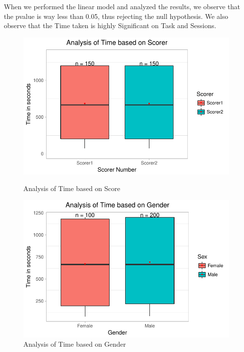 \documentclass[12pt,epsf]{report}
\begin{document}
{When we performed the linear model and analyzed the results, we observe that the pvalue is way less than 0.05, thus rejecting the null hypothesis. We also observe that the Time taken is highly Significant on Task and Sessions. \\
\begin{figure}[!htb]
	\begin{minipage}[c]{0.5\linewidth}
	\includegraphics[width=\linewidth]{ScorerVsTime.pdf}
	\caption{Analysis of Time based on Score }
	\end{minipage}
	\hfill
	\begin{minipage}[c]{0.5\linewidth}
	\includegraphics[width=\linewidth]{GenderVsTime.pdf}
	\caption{Analysis of Time based on Gender}
	\end{minipage}
\end{figure}
\begin{figure}[!htb]
	\begin{minipage}[c]{0.5\linewidth}

\end{minipage}
\end{figure}}
\end{document}
